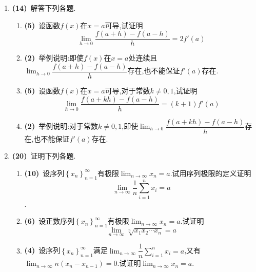 \documentclass{ctexart}
\begin{document}
\begin{enumerate}[leftmargin=*,label=\textbf{\arabic*.},topsep=0pt,parsep=0pt,itemsep=0pt,partopsep=0pt]
    \item \textbf{(14)}\ 解答下列各题.
    \begin{enumerate}[label=\textbf{(\arabic*)}]
        \item \textbf{(5)}\ 设函数$f(x)$在$x=a$可导,试证明$$\lim_{h\to0}\dfrac{f(a+h)-f(a-h)}{h}=2f'(a)$$
        \item \textbf{(2)}\ 举例说明:即使$f(x)$在$x=a$处连续且$\displaystyle\lim_{h\to0}\dfrac{f(a+h)-f(a-h)}{h}$存在,也不能保证$f'(a)$存在.
        \item \textbf{(5)}\ 设函数$f(x)$在$x=a$可导,对于常数$k\neq0,1$,试证明$$\lim_{h\to0}\dfrac{f(a+kh)-f(a-h)}{h}=(k+1)f'(a)$$
        \item \textbf{(2)}\ 举例说明:对于常数$k\neq0,1$,即使$\displaystyle\lim_{h\to0}\dfrac{f(a+kh)-f(a-h)}{h}$存在,也不能保证$f'(a)$存在.
    \end{enumerate}

    \item \textbf{(20)}\ 证明下列各题.
        \begin{enumerate}[label=\textbf{(\arabic*)}]
            \item \textbf{(10)}\ 设序列$\left\{x_n\right\}_{n=1}^{\infty}$有极限$\displaystyle\lim_{n\to\infty}x_n=a$.试用序列极限的定义证明$$\displaystyle\lim_{n\to\infty}\dfrac{1}{n}\sum_{i=1}^{n}x_i=a$$.
            \item \textbf{(6)}\ 设正数序列$\left\{x_n\right\}_{n=1}^{\infty}$有极限$\displaystyle\lim_{n\to\infty}x_n=a$.试证明$$\lim_{n\to\infty}\sqrt[n]{x_1x_2\cdots x_n}=a$$
            \item \textbf{(4)}\ 设序列$\left\{x_n\right\}_{n=1}^{\infty}$满足$\displaystyle\lim_{n\to\infty}\dfrac{1}{n}\sum_{i=1}^{n}x_i=a$,又有$\displaystyle\lim_{n\to\infty}n\left(x_n-x_{n-1}\right)=0$.试证明$\displaystyle\lim_{n\to\infty}x_n=a$.
        \end{enumerate}
\end{enumerate}
\end{document}

